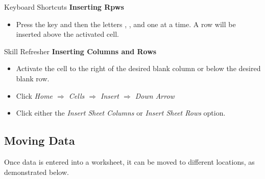 \begin{center}
	\begin{shtcutbox}{Keyboard Shortcuts}
		\textbf{Inserting Rpws}
		\\
		\begin{itemize}
			\setlength{\itemsep}{0pt}
			\setlength{\parskip}{0pt}
			\setlength{\parsep}{0pt}
			
			\item Press the  key and then the letters , , and  one at a time. A row will be inserted above the activated cell.
			
		\end{itemize}
	\end{shtcutbox}
\end{center}

\begin{center}
	\begin{sklbox}{Skill Refresher}
		\textbf{Inserting Columns and Rows}
		\\
		\begin{itemize}
			\setlength{\itemsep}{0pt}
			\setlength{\parskip}{0pt}
			\setlength{\parsep}{0pt}
			
			\item Activate the cell to the right of the desired blank column or below the desired blank row.
			\item Click \textit{Home $ \Rightarrow $ Cells $ \Rightarrow $ Insert $ \Rightarrow $ Down Arrow}
			\item Click either the \textit{Insert Sheet Columns} or \textit{Insert Sheet Rows} option.
			
		\end{itemize}
	\end{sklbox}
\end{center}

\subsection{Moving Data}

Once data is entered into a worksheet, it can be moved to different locations, as demonstrated below.

